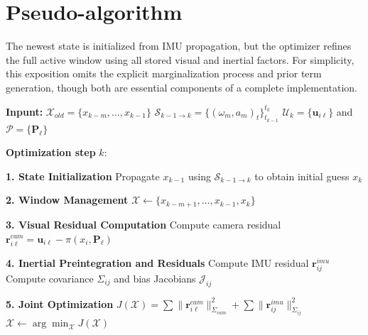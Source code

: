 \documentclass[11pt]{article}
\begin{document}
\newpage

\section{Pseudo-algorithm}
The newest state is initialized from IMU propagation, but the optimizer refines the full active window using all stored visual and inertial factors.
For simplicity, this exposition omits the explicit marginalization process and prior term generation, though both are essential components of a complete implementation.

\begin{algorithm}[h]
\caption{Keyframe-Based Visual-Inertial Sliding Window Optimization}
\label{alg:vio_sliding_window}
\begin{algorithmic}[1]
\State \textbf{Inpunt:} 
    \Statex \hspace{\algorithmicindent} $\mathcal{X}_{old} = \{x_{k-m}, \dots, x_{k-1}\}$ 
    \Statex \hspace{\algorithmicindent} $\mathcal{S}_{k-1 \to k} = \{(\omega_m, a_m)_t\}_{t_{k-1}}^{t_k}$ 
    \Statex \hspace{\algorithmicindent} $\mathcal{U}_k = \{\mathbf{u}_{i\ell}\}$ and $\mathcal{P} = \{\mathbf{P}_\ell\}$ 
    
\State \textbf{Optimization step} $k$:

\Statex \textbf{1. State Initialization}
\State Propagate $x_{k-1}$ using $\mathcal{S}_{k-1 \to k}$ to obtain initial guess $x_k$

\Statex \textbf{2. Window Management}
\State $\mathcal{X} \gets \{x_{k-m+1}, \dots, x_{k-1}, x_k\}$ 

\Statex \textbf{3. Visual Residual Computation}
    \State Compute camera residual $\mathbf{r}^{cam}_{i\ell} = \mathbf{u}_{i\ell} - \pi(x_i, \mathbf{P}_\ell)$ 
\EndFor

\Statex \textbf{4. Inertial Preintegration and Residuals}
    \State Compute IMU residual $\mathbf{r}^{imu}_{ij}$ 
    \State Compute covariance $\Sigma_{ij}$ and bias Jacobians $\mathcal{J}_{ij}$
\EndFor

\Statex \textbf{5. Joint Optimization}
\State $J(\mathcal{X}) = \sum \|\mathbf{r}^{cam}_{i\ell}\|^2_{\Sigma_{cam}} + \sum \|\mathbf{r}^{imu}_{ij}\|^2_{\Sigma_{ij}}$
\State $\mathcal{X} \gets \arg\min_{\mathcal{X}} J(\mathcal{X})$ 

\end{algorithmic}
\end{algorithm}
\end{document}
